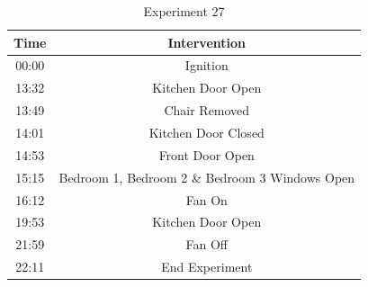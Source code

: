 \documentclass{article}
\begin{document}
\begin{table}[H]
	\centering
	\caption{Experiment 27}
	\begin{tabular}{|c|c|}
		\hline
		Time & Intervention \\ \hline \hline
		00:00 & Ignition \\ \hline
		13:32 & Kitchen Door Open \\ \hline
		13:49 & Chair Removed \\ \hline
		14:01 & Kitchen Door Closed \\ \hline
		14:53 & Front Door Open \\ \hline
		15:15 & Bedroom 1, Bedroom 2 \& Bedroom 3 Windows Open \\ \hline
		16:12 & Fan On \\ \hline
		19:53 & Kitchen Door Open \\ \hline
		21:59 & Fan Off \\ \hline
		22:11 & End Experiment \\ \hline
	\end{tabular}
	\label{tab:Exp31Events}
\end{table}

\clearpage
\end{document}
